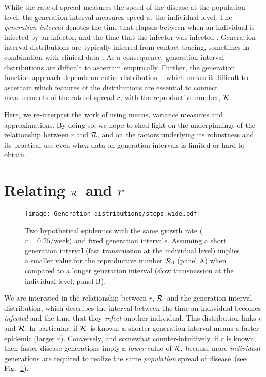 \documentclass[12pt]{article}
\newcommand{\RR}{\ensuremath{{\cal R}}}
\newcommand{\Rx}[1]{\ensuremath{{\cal R}_{#1}}}
\newcommand{\Ro}{\Rx{0}}
\newcommand{\fref}[1]{Fig.~\ref{fig:#1}}
\begin{document}
While the rate of spread measures the speed of the disease at the population level, the generation interval measures speed at the individual level.
The \emph{generation interval} denotes the time that elapses between when an individual is infected by an infector, and the time that the infector was infected \cite{Sven07}.
Generation interval distributions are typically inferred from contact tracing, sometimes in combination with clinical data \cite{AylwBarb14,LessOtt16,HubeJohn16}.
As a consequence, generation interval distributions are difficult to ascertain empirically. Further, the generation function approach depends on entire distribution -- which makes it difficult to ascertain which features of the distributions are essential to connect measurements of the rate of spread $r$, with the reproductive number, \RR.

Here, we re-interpret the work of \cite{WallLips07} using means, variance measures and approximations.
By doing so, we hope to shed light on the underpinnings of the relationship between $r$ and \RR, and on the factors underlying its robustness and its practical use even when data on generation intervals is limited or hard to obtain.

\section{Relating \RR\ and $r$}

\begin{figure}[htbp] \centering
	\texttt{[image: Generation\_distributions/steps.wide.pdf]}
	\caption{Two hypothetical epidemics with the same growth rate ($r=0.25/\mathrm{week}$) and fixed generation intervals.  Assuming a short generation interval (fast transmission at the individual level) implies a smaller value for the reproductive number $\Ro$ (panel A) when compared to a longer generation interval (slow transmission at the individual level, panel B). 
	\label{fig:link}}
\end{figure}

We are interested in the relationship between $r$, \RR~and the generation-interval distribution, which describes the interval between the time an individual becomes \emph{infected} and the time that they \emph{infect} another individual.
This distribution links $r$ and \RR. In particular, if \RR~is known, a shorter generation interval means a faster epidemic (larger $r$). Conversely, and somewhat counter-intuitively, if $r$ is known, then faster disease generations imply a \emph{lower} value of \RR, because more \emph{individual} generations are required to realize the same \emph{population} spread of disease~(see \fref{link}).
\end{document}

